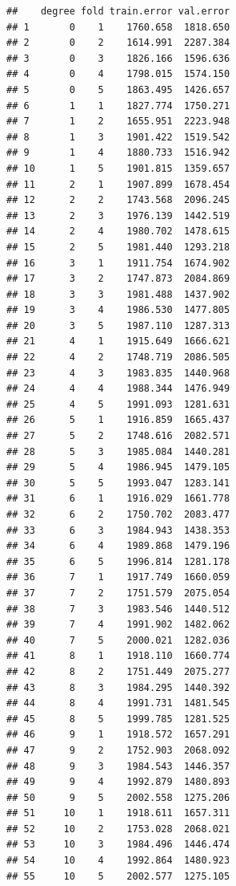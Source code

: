 \documentclass[]{article}
\newenvironment{Shaded}{\begin{snugshade}}{\end{snugshade}}
\newcommand{\KeywordTok}[1]{\textcolor[rgb]{0.13,0.29,0.53}{\textbf{#1}}}
\newcommand{\DataTypeTok}[1]{\textcolor[rgb]{0.13,0.29,0.53}{#1}}
\newcommand{\DecValTok}[1]{\textcolor[rgb]{0.00,0.00,0.81}{#1}}
\newcommand{\StringTok}[1]{\textcolor[rgb]{0.31,0.60,0.02}{#1}}
\newcommand{\OperatorTok}[1]{\textcolor[rgb]{0.81,0.36,0.00}{\textbf{#1}}}
\newcommand{\NormalTok}[1]{#1}
\begin{document}
\begin{verbatim}
##    degree fold train.error val.error
## 1       0    1    1760.658  1818.650
## 2       0    2    1614.991  2287.384
## 3       0    3    1826.166  1596.636
## 4       0    4    1798.015  1574.150
## 5       0    5    1863.495  1426.657
## 6       1    1    1827.774  1750.271
## 7       1    2    1655.951  2223.948
## 8       1    3    1901.422  1519.542
## 9       1    4    1880.733  1516.942
## 10      1    5    1901.815  1359.657
## 11      2    1    1907.899  1678.454
## 12      2    2    1743.568  2096.245
## 13      2    3    1976.139  1442.519
## 14      2    4    1980.702  1478.615
## 15      2    5    1981.440  1293.218
## 16      3    1    1911.754  1674.902
## 17      3    2    1747.873  2084.869
## 18      3    3    1981.488  1437.902
## 19      3    4    1986.530  1477.805
## 20      3    5    1987.110  1287.313
## 21      4    1    1915.649  1666.621
## 22      4    2    1748.719  2086.505
## 23      4    3    1983.835  1440.968
## 24      4    4    1988.344  1476.949
## 25      4    5    1991.093  1281.631
## 26      5    1    1916.859  1665.437
## 27      5    2    1748.616  2082.571
## 28      5    3    1985.084  1440.281
## 29      5    4    1986.945  1479.105
## 30      5    5    1993.047  1283.141
## 31      6    1    1916.029  1661.778
## 32      6    2    1750.702  2083.477
## 33      6    3    1984.943  1438.353
## 34      6    4    1989.868  1479.196
## 35      6    5    1996.814  1281.178
## 36      7    1    1917.749  1660.059
## 37      7    2    1751.579  2075.054
## 38      7    3    1983.546  1440.512
## 39      7    4    1991.902  1482.062
## 40      7    5    2000.021  1282.036
## 41      8    1    1918.110  1660.774
## 42      8    2    1751.449  2075.277
## 43      8    3    1984.295  1440.392
## 44      8    4    1991.731  1481.545
## 45      8    5    1999.785  1281.525
## 46      9    1    1918.572  1657.291
## 47      9    2    1752.903  2068.092
## 48      9    3    1984.543  1446.357
## 49      9    4    1992.879  1480.893
## 50      9    5    2002.558  1275.206
## 51     10    1    1918.611  1657.311
## 52     10    2    1753.028  2068.021
## 53     10    3    1984.496  1446.474
## 54     10    4    1992.864  1480.923
## 55     10    5    2002.577  1275.105
\end{verbatim}

\begin{Shaded}
\end{Shaded}
\end{document}
